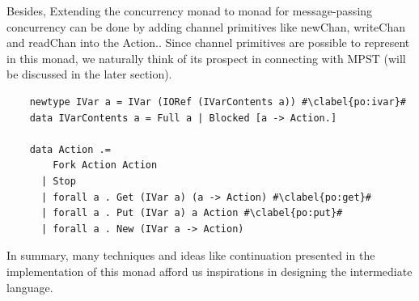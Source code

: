 Besides, Extending the concurrency monad to monad for message-passing concurrency can be done by adding channel primitives like newChan, writeChan and readChan into the Action.. Since channel primitives are possible to represent in this monad, we naturally think of its prospect in connecting with MPST (will be discussed in the later section).
\begin{code}
  \begin{verbatim}
    newtype IVar a = IVar (IORef (IVarContents a)) #\clabel{po:ivar}#
    data IVarContents a = Full a | Blocked [a -> Action.]
    
    data Action .=
        Fork Action Action
      | Stop
      | forall a . Get (IVar a) (a -> Action) #\clabel{po:get}#
      | forall a . Put (IVar a) a Action #\clabel{po:put}#
      | forall a . New (IVar a -> Action)
  \end{verbatim}
  \label{b:mo:c3}
\end{code}

In summary, many techniques and ideas like continuation presented in the implementation of this monad afford us inspirations in designing the intermediate language.
